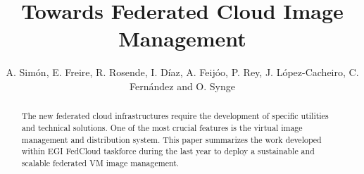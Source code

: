 \documentclass{llncs_Ibergrid2013}
\begin{document}
%
\frontmatter          %
%
\pagestyle{headings}  %
%
\mainmatter              %
%
\title{Towards Federated Cloud Image Management}
%
%
\author{A. Sim\'on, E. Freire, R. Rosende, I. D\'iaz, A. Feij\'oo, P. Rey, J. L\'opez-Cacheiro, C. Fern\'andez and O. Synge}
%
%
%




\maketitle              %

\begin{abstract}
The new federated cloud infrastructures require the development of specific utilities and technical solutions. One of the most crucial features is the virtual image management and distribution system.
This paper summarizes the work developed within EGI FedCloud taskforce during the last year to deploy a sustainable and scalable federated VM image management.
\end{abstract}

%
\end{document}
